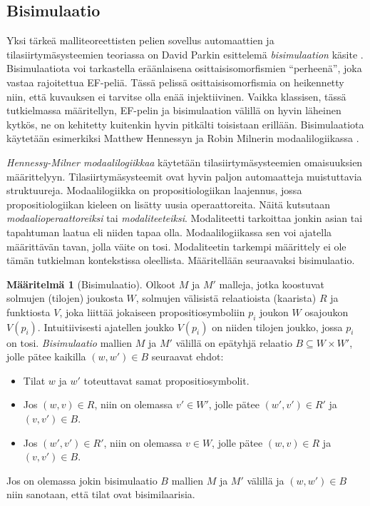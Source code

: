 \documentclass[finnish]{tktltiki2}
\theoremstyle{definition}
\newtheorem{maar}[lau]{Määritelmä}
\theoremstyle{remark}
\begin{document}
\subsection{Bisimulaatio}
Yksi tärkeä malliteoreettisten pelien sovellus automaattien ja tilasiirtymäsysteemien teoriassa on David Parkin esittelemä \textit{bisimulaation} käsite \cite{Par81}. Bisimulaatiota voi tarkastella eräänlaisena osittaisisomorfismien ``perheenä'', joka vastaa rajoitettua EF-peliä. Tässä pelissä osittaisisomorfismia on heikennetty niin, että kuvauksen ei tarvitse olla enää injektiivinen. Vaikka klassisen, tässä tutkielmassa määritellyn, EF-pelin ja bisimulaation välillä on hyvin läheinen kytkös, ne on kehitetty kuitenkin hyvin pitkälti toisistaan erillään. Bisimulaatiota käytetään esimerkiksi Matthew Hennessyn ja Robin Milnerin modaalilogiikassa \cite{Hen80}. 

\textit{Hennessy-Milner modaalilogiikkaa} käytetään tilasiirtymäsysteemien omaisuuksien määrittelyyn. Tilasiirtymäsysteemit ovat hyvin paljon automaatteja muistuttavia struktuureja. Modaalilogiikka on propositiologiikan laajennus, jossa propositiologiikan kieleen on lisätty uusia operaattoreita. Näitä kutsutaan \textit{modaalioperaattoreiksi} tai \textit{modaliteeteiksi}. Modaliteetti tarkoittaa jonkin asian tai tapahtuman laatua eli niiden tapaa olla. Modaalilogiikassa sen voi ajatella määrittävän tavan, jolla väite on tosi. Modaliteetin tarkempi määrittely ei ole tämän tutkielman kontekstissa oleellista. Määritellään seuraavaksi bisimulaatio.

\begin{maar}[Bisimulaatio]
Olkoot $M$ ja $M'$ malleja, jotka koostuvat solmujen (tilojen) joukosta $W$, solmujen välisistä relaatioista (kaarista) $R$ ja funktiosta $V$, joka liittää jokaiseen propositiosymboliin $p_i$ joukon $W$ osajoukon $V(p_i)$. Intuitiivisesti ajatellen joukko $V(p_i)$ on niiden tilojen joukko, jossa $p_i$ on tosi. \textit{Bisimulaatio} mallien $M$ ja $M'$ välillä on epätyhjä relaatio $B \subseteq W \times W'$, jolle pätee kaikilla $(w, w') \in B$ seuraavat ehdot:
\begin{itemize}
\item Tilat $w$ ja $w'$ toteuttavat samat propositiosymbolit.
\item Jos $(w, v) \in R$, niin on olemassa $v' \in W'$, jolle pätee $(w', v') \in R'$ ja $(v, v') \in B$.
\item Jos $(w', v') \in R'$, niin on olemassa $v \in W$, jolle pätee $(w, v) \in R$ ja $(v, v') \in B$.
\end{itemize}
Jos on olemassa jokin bisimulaatio $B$ mallien $M$ ja $M'$ välillä ja $(w, w') \in B$ niin sanotaan, että tilat ovat bisimilaarisia.
\end{maar}
\end{document}
